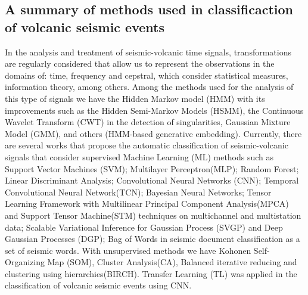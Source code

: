 \documentclass[journal]{IEEEtran}
\begin{document}
\subsection{A summary of methods used in classificaction of volcanic seismic events}
In the analysis and treatment of seismic-volcanic time signals, transformations are regularly considered that allow us to represent the observations in the domains of: time, frequency and cepstral\cite{malfante2018automatic,lara2020automatic}, which consider statistical measures, information theory, among others. Among the methods used for the analysis of this type of signals we have the Hidden Markov model (HMM)\cite{bicego2012classification,beyreuther2012constructing, carniel2014characterization} with its improvements such as the Hidden Semi-Markov Models (HSMM), the Continuous Wavelet Transform (CWT)\cite{beyreuther2012constructing} in the detection of singularities, Gaussian Mixture Model (GMM)\cite{langer2009synopsis}, and others (HMM-based generative embedding)\cite{bicego2012classification}.
Currently, there are several works that propose the automatic classification of seismic-volcanic signals that consider supervised Machine Learning (ML) methods such as Support Vector Machines (SVM)\cite{malfante2018automatic,curilem2016pattern,giacco2009support,langer2009synopsis,lara2020automatic,curilem2018improving,malfante2018machine}; Multilayer Perceptron(MLP)\cite{giacco2009support,langer2009synopsis,lara2020automatic}; Random Forest\cite{malfante2018automatic,lara2020automatic,titos2019classification}; Linear Discriminant Analysis\cite{lara2020automatic}; Convolutional Neural Networks (CNN)\cite{titos2019classification,salazar2020deep,curilem2018using}; Temporal Convolutional Neural Network(TCN)\cite{titos2019classification,rodriguez2021bayesian}; Bayesian Neural Networks\cite{bueno2019volcano}; Tensor Learning Framework with Multilinear Principal Component Analysis(MPCA) and Support Tensor Machine(STM)\cite{peixoto2021tensor} techniques on multichannel and multistation data; Scalable Variational Inference for Gaussian Process (SVGP) and Deep Gaussian Processes (DGP)\cite{lopez2020acontribution}; Bag of Words in seismic document classification as a set of seismic words\cite{bicego2015volcano}.
With unsupervised methods we have Kohonen Self-Organizing Map (SOM)\cite{langer2009synopsis,esposito2008unsupervised}, Cluster Analysis(CA)\cite{langer2009synopsis}, Balanced iterative reducing and clustering using hierarchies(BIRCH)\cite{duque2020exploring}.
Transfer Learning (TL) was applied in the classification of volcanic seismic events using CNN\cite{mythesismaster,titos2019classification}.
\end{document}
